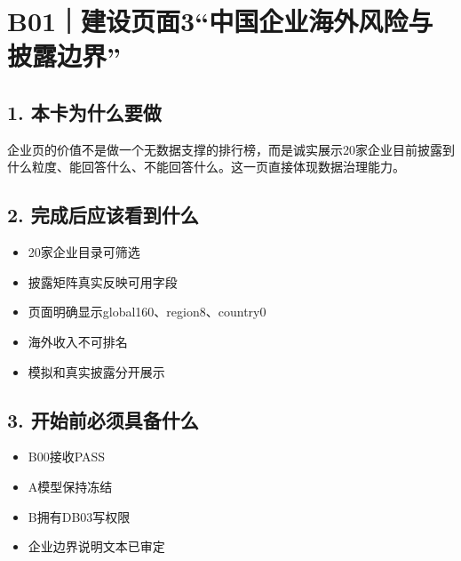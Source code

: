 \documentclass[UTF8,openany,zihao=-4]{ctexbook}
\renewcommand{\_}{\textunderscore\allowbreak}
\begin{document}
\clearpage
\section{B01｜建设页面3“中国企业海外风险与披露边界”}
\subsection*{1. 本卡为什么要做}
企业页的价值不是做一个无数据支撑的排行榜，而是诚实展示20家企业目前披露到什么粒度、能回答什么、不能回答什么。这一页直接体现数据治理能力。


\subsection*{2. 完成后应该看到什么}
\begin{itemize}
\item 20家企业目录可筛选
\item 披露矩阵真实反映可用字段
\item 页面明确显示global160、region8、country0
\item 海外收入不可排名
\item 模拟和真实披露分开展示
\end{itemize}

\subsection*{3. 开始前必须具备什么}
\begin{itemize}[label=$\square$]
\item B00接收PASS
\item A模型保持冻结
\item B拥有DB03写权限
\item 企业边界说明文本已审定
\end{itemize}
\end{document}
